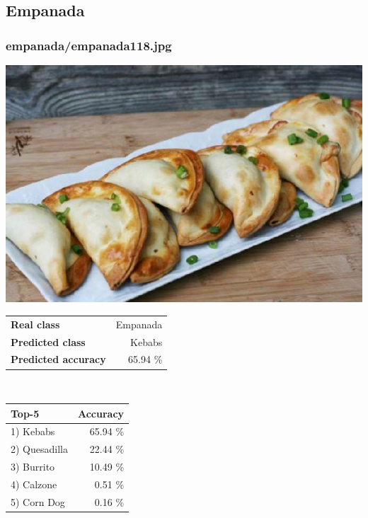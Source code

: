 \subsection{Empanada}
    
\subsubsection{empanada/empanada118.jpg}

\begin{minipage}[t]{0.4\textwidth}
	\vspace{0pt}
	\includegraphics[width=\linewidth]{images/evaluation-images/empanada/empanada118.jpg}
\end{minipage}
\hfill
\begin{minipage}[t]{0.5\textwidth}
	\vspace{0pt}\raggedright
	\begin{tabularx}{\textwidth}{X r}
		\small \textbf{Real class} & \small Empanada\\
		\small \textbf{Predicted class} & \small Kebabs\\
		\small \textbf{Predicted accuracy} & \small 65.94 \%
    \end{tabularx}\\
    
    \vspace{6pt}
	\begin{tabularx}{\textwidth}{X r}
        \small \textbf{Top-5} & \small \textbf{Accuracy} \\
        \hline
		\small 1) Kebabs & \small 65.94 \%\\\small 2) Quesadilla & \small 22.44 \%\\\small 3) Burrito & \small 10.49 \%\\\small 4) Calzone & \small 0.51 \%\\\small 5) Corn Dog & \small 0.16 \%
    \end{tabularx}
\end{minipage}
    
